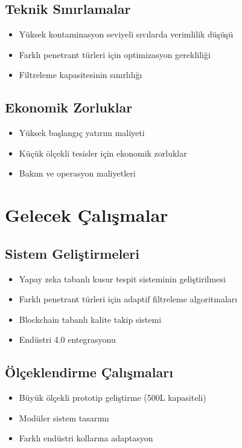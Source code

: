 \documentclass[12pt,a4paper]{article}
\begin{document}
\subsection{Teknik Sınırlamalar}

\begin{itemize}
\item Yüksek kontaminasyon seviyeli sıvılarda verimlilik düşüşü
\item Farklı penetrant türleri için optimizasyon gerekliliği
\item Filtreleme kapasitesinin sınırlılığı
\end{itemize}

\subsection{Ekonomik Zorluklar}

\begin{itemize}
\item Yüksek başlangıç yatırım maliyeti
\item Küçük ölçekli tesisler için ekonomik zorluklar
\item Bakım ve operasyon maliyetleri
\end{itemize}

\section{Gelecek Çalışmalar}

\subsection{Sistem Geliştirmeleri}

\begin{itemize}
\item Yapay zeka tabanlı kusur tespit sisteminin geliştirilmesi \cite{smith2020automated, petrov2021ai}
\item Farklı penetrant türleri için adaptif filtreleme algoritmaları
\item Blockchain tabanlı kalite takip sistemi
\item Endüstri 4.0 entegrasyonu
\end{itemize}

\subsection{Ölçeklendirme Çalışmaları}

\begin{itemize}
\item Büyük ölçekli prototip geliştirme (500L kapasiteli)
\item Modüler sistem tasarımı
\item Farklı endüstri kollarına adaptasyon
\end{itemize}
\end{document}
